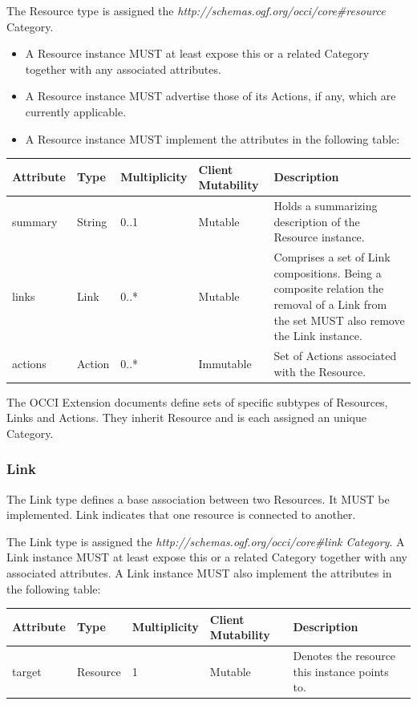 \documentclass[10pt,a4paper]{article}
\begin{document}
The Resource type is assigned the \textit{http://schemas.ogf.org/occi/core\#resource} Category.

\begin{itemize}
  \item A Resource instance MUST at least expose this or a related Category together with any associated attributes.
  \item A Resource instance MUST advertise those of its Actions, if any, which are currently applicable.
  \item A Resource instance MUST implement the attributes in the following table:
\end{itemize}

\begin{tabular}{l|l|l|l|p{2.7in}}
Attribute & Type & Multiplicity & Client Mutability & Description \\
\hline
summary & String & 0..1 & Mutable & Holds a summarizing description of the Resource instance.\\
links & Link & 0..* & Mutable & Comprises a set of Link compositions. Being a composite relation the removal of a Link from the set MUST also remove the Link instance.\\
actions & Action & 0..* & Immutable & Set of Actions associated with the Resource.\\
\end{tabular}

The OCCI Extension documents define sets of specific subtypes of Resources, Links and Actions. They inherit Resource and is each assigned an unique Category.

\subsubsection{Link}
The Link type defines a base association between two Resources. It MUST be implemented. Link indicates that one resource is connected to another.

The Link type is assigned the \textit{http://schemas.ogf.org/occi/core\#link Category}. A Link instance MUST at least expose this or a related Category together with any associated attributes. A Link instance MUST also implement the attributes in the following table:

\begin{tabular}{l|l|l|l|p{2.7in}}
Attribute & Type & Multiplicity & Client Mutability & Description \\
\hline
target & Resource & 1 & Mutable & Denotes the resource this instance points to.\\
\end{tabular}
\end{document}
